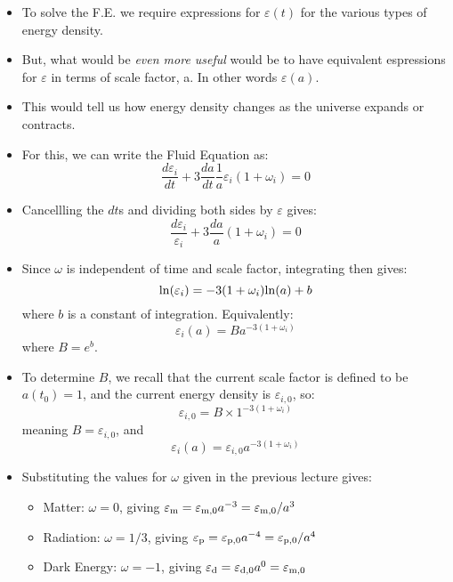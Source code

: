 \documentclass[11pt]{article}
\newcommand{\vep}[1]{\ensuremath{\varepsilon#1}}
\begin{document}
\begin{itemize}
\item To solve the F.E. we require expressions for \vep{(t)} for the various types of energy density.
\item But, what would be {\it even more useful} would be to have equivalent espressions for \vep{} in terms of scale factor, a. In other words \vep{(a)}.
\item This would tell us how energy density changes as the universe expands or contracts.
\item For this, we can write the Fluid Equation as:
\begin{equation}
\frac{d\vep{_i}}{dt} + 3\frac{da}{dt}\frac{1}{a}\vep{_i}(1 + \omega_i) = 0
\end{equation}
\item Cancellling the $dt$s and dividing both sides by \vep{} gives:
\begin{equation}    
\frac{d\vep{_i}}{\vep{_i}} + 3\frac{da}{a}(1 + \omega_i) = 0
\end{equation}
\item Since $\omega$ is independent of time and scale factor, integrating then gives:
\begin{equation}
{\rm ln}(\vep{_i}) = -3(1+\omega_i){\rm ln}(a) + b
\end{equation}
where $b$ is a constant of integration. Equivalently:
\begin{equation}
    \vep{_i(a)} = Ba^{-3(1+\omega_i)}
\end{equation}
where $B=e^b$.
\item To determine $B$, we recall that the current scale factor is defined to be $a(t_0) = 1$, and the current energy density is \vep{_{i,0}}, so:
\begin{equation}
    \vep{_{i,0}} = B\times1^{-3(1+\omega_i)}
\end{equation}
meaning $B=\vep{_{i,0}}$, and
\begin{equation}
    \vep{_{i}(a)} = \vep{_{i,0}}a^{-3(1+\omega_i)}
\end{equation}
\item Substituting the values for $\omega$ given in the previous lecture gives:
\begin{itemize}
\item Matter: $\omega = 0$, giving $\vep{_{\rm m}} = \vep{_{\rm m,0}}a^{-3} = \vep{_{\rm m,0}}/{a^3}$ 
\item Radiation: $\omega = 1/3$, giving $\vep{_{\rm p}} = \vep{_{\rm p,0}}a^{-4} = \vep{_{\rm p,0}}/{a^4}$
\item Dark Energy: $\omega = -1$, giving $\vep{_{\rm d}} = \vep{_{\rm d,0}}a^{0} = \vep{_{\rm m,0}}$

\end{itemize}
\end{itemize}
\end{document}
